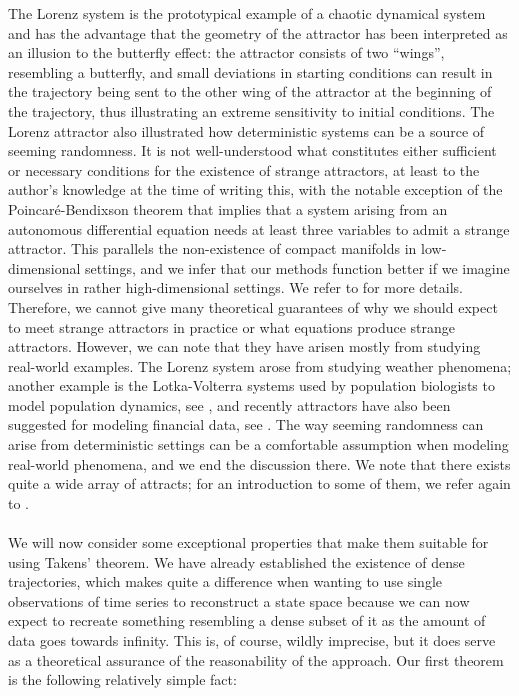 \documentclass[11pt, a4paper]{memoir}
\theoremstyle{break}
\theoremstyle{break}
\theoremstyle{nonumberplain}
\begin{document}
The Lorenz system is the prototypical example of a chaotic dynamical system and has the advantage that the geometry of the attractor has been interpreted as an illusion to the butterfly effect: the attractor consists of two \enquote{wings}, resembling a butterfly, and small deviations in starting conditions can result in the trajectory being sent to the other wing of the attractor at the beginning of the trajectory, thus illustrating an extreme sensitivity to initial conditions. The Lorenz attractor also illustrated how deterministic systems can be a source of seeming randomness. It is not well-understood what constitutes either sufficient or necessary conditions for the existence of strange attractors, at least to the author's knowledge at the time of writing this, with the notable exception of the Poincaré-Bendixson theorem that implies that a system arising from an autonomous differential equation needs at least three variables to admit a strange attractor. This parallels the non-existence of compact manifolds in low-dimensional settings, and we infer that our methods function better if we imagine ourselves in rather high-dimensional settings. We refer to \cite{Hilborn} for more details. Therefore, we cannot give many theoretical guarantees of why we should expect to meet strange attractors in practice or what equations produce strange attractors. However, we can note that they have arisen mostly from studying real-world examples. The Lorenz system arose from studying weather phenomena; another example is the Lotka-Volterra systems used by population biologists to model population dynamics, see \cite{Sprott}, and recently attractors have also been suggested for modeling financial data, see \cite{finance}. The way seeming randomness can arise from deterministic settings can be a comfortable assumption when modeling real-world phenomena, and we end the discussion there. We note that there exists quite a wide array of attracts; for an introduction to some of them, we refer again to \cite{Sprott}.\\\\
We will now consider some exceptional properties that make them suitable for using Takens' theorem. We have already established the existence of dense trajectories, which makes quite a difference when wanting to use single observations of time series to reconstruct a state space because we can now expect to recreate something resembling a dense subset of it as the amount of data goes towards infinity. This is, of course, wildly imprecise, but it does serve as a theoretical assurance of the reasonability of the approach. Our first theorem is the following relatively simple fact:
\end{document}
